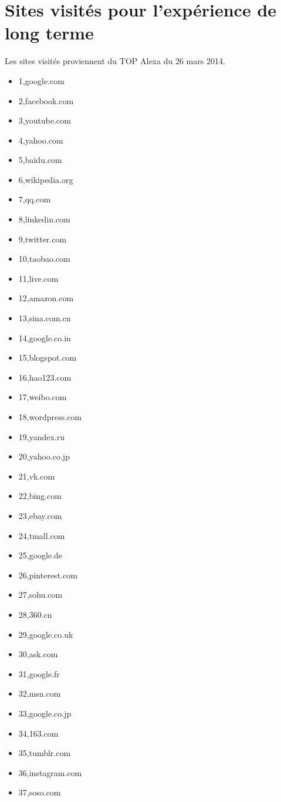 \appendix
\chapter{Sites visités pour l'expérience de long terme}
Les sites visités proviennent du TOP Alexa du 26 mars 2014.
\begin{multicols}{3}
\begin{itemize}
	\item 1,google.com
	\item 2,facebook.com
	\item 3,youtube.com
	\item 4,yahoo.com
	\item 5,baidu.com
	\item 6,wikipedia.org
	\item 7,qq.com
	\item 8,linkedin.com
	\item 9,twitter.com
	\item 10,taobao.com
	\item 11,live.com
	\item 12,amazon.com
	\item 13,sina.com.cn
	\item 14,google.co.in
	\item 15,blogspot.com
	\item 16,hao123.com
	\item 17,weibo.com
	\item 18,wordpress.com
	\item 19,yandex.ru
	\item 20,yahoo.co.jp
	\item 21,vk.com
	\item 22,bing.com
	\item 23,ebay.com
	\item 24,tmall.com
	\item 25,google.de
	\item 26,pinterest.com
	\item 27,sohu.com
	\item 28,360.cn
	\item 29,google.co.uk
	\item 30,ask.com
	\item 31,google.fr
	\item 32,msn.com
	\item 33,google.co.jp
	\item 34,163.com
	\item 35,tumblr.com
	\item 36,instagram.com
	\item 37,soso.com

\end{itemize}
\end{multicols}
